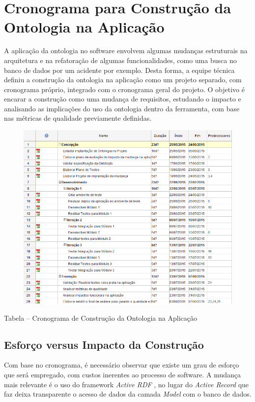 \section{Cronograma para Construção da Ontologia na Aplicação}

A aplicação da ontologia no software envolvem algumas mudanças estruturais na arquitetura e
na refatoração de algumas funcionalidades, como uma busca no banco de dados por um acidente por 
exemplo. Desta forma, a equipe técnica definiu a construção da ontologia na aplicação como um projeto
separado, com cronograma próprio, integrado com o cronograma geral do projeto.
O objetivo é encarar a construção como uma mudança de requisitos, estudando o impacto e analisando
as implicações do uso da ontologia dentro da ferramenta, com base nas métricas de qualidade previamente 
definidas. 

\begin{figure}[h]
	\centering
	\includegraphics[scale=0.6]{Figuras/cronograma_construcao_ontologia.png}
\end{figure}

\pagebreak

Tabela – Cronograma de Construção da Ontologia na Aplicação

\subsection{Esforço versus Impacto da Construção}

Com base no cronograma, é necessário observar que existe um grau de esforço que será empregado,
com custos inerentes ao processo de software. A mudança mais relevante é o uso do framework \textit{Active RDF} \footnotemark[1], no lugar do \textit{Active Record} que faz deixa transparente o acesso de dados da camada \textit{Model} com o banco de dados. 

